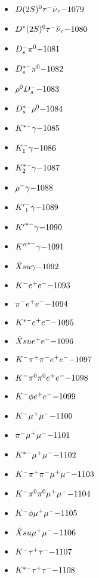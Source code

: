 \begin{multicols}{3}
\begin{itemize}
 \item $ D(2S)^{0} \tau^{-} \bar{\nu}_{\tau} \hfill{-1079}$
 \item $ D^{*}(2S)^{0} \tau^{-} \bar{\nu}_{\tau} \hfill{-1080}$
 \item $ D_{s}^{-} \pi^{0} \hfill{-1081}$
 \item $ D_{s}^{*-} \pi^{0} \hfill{-1082}$
 \item $ \rho^{0} D_{s}^{-} \hfill{-1083}$
 \item $ D_{s}^{*-} \rho^{0} \hfill{-1084}$
 \item $ K^{*-} \gamma \hfill{-1085}$
 \item $ K_{1}^{-} \gamma \hfill{-1086}$
 \item $ K_{2}^{*-} \gamma \hfill{-1087}$
 \item $ \rho^{-} \gamma \hfill{-1088}$
 \item $ {K^{\prime}}_{1}^{-} \gamma \hfill{-1089}$
 \item $ {K^{\prime}}^{*-} \gamma \hfill{-1090}$
 \item $ {K^{\prime\prime}}^{*-} \gamma \hfill{-1091}$
 \item $ \bar{X}su \gamma \hfill{-1092}$
 \item $ K^{-} e^{+} e^{-} \hfill{-1093}$
 \item $ \pi^{-} e^{+} e^{-} \hfill{-1094}$
 \item $ K^{*-} e^{+} e^{-} \hfill{-1095}$
 \item $ \bar{X}su e^{+} e^{-} \hfill{-1096}$
 \item $ K^{-} \pi^{+} \pi^{-} e^{+} e^{-} \hfill{-1097}$
 \item $ K^{-} \pi^{0} \pi^{0} e^{+} e^{-} \hfill{-1098}$
 \item $ K^{-} \phi e^{+} e^{-} \hfill{-1099}$
 \item $ K^{-} \mu^{+} \mu^{-} \hfill{-1100}$
 \item $ \pi^{-} \mu^{+} \mu^{-} \hfill{-1101}$
 \item $ K^{*-} \mu^{+} \mu^{-} \hfill{-1102}$
 \item $ K^{-} \pi^{+} \pi^{-} \mu^{+} \mu^{-} \hfill{-1103}$
 \item $ K^{-} \pi^{0} \pi^{0} \mu^{+} \mu^{-} \hfill{-1104}$
 \item $ K^{-} \phi \mu^{+} \mu^{-} \hfill{-1105}$
 \item $ \bar{X}su \mu^{+} \mu^{-} \hfill{-1106}$
 \item $ K^{-} \tau^{+} \tau^{-} \hfill{-1107}$
 \item $ K^{*-} \tau^{+} \tau^{-} \hfill{-1108}$

\end{itemize}
\end{multicols}
